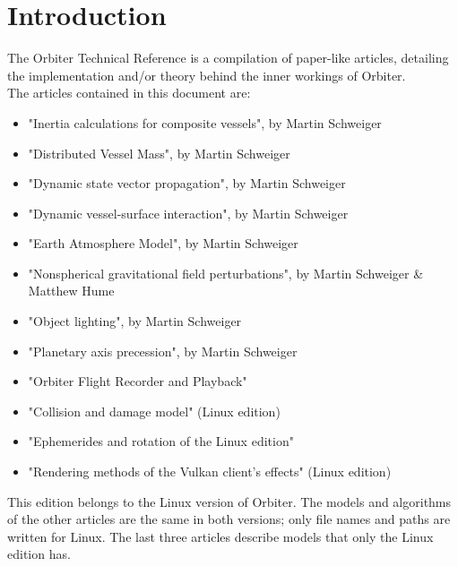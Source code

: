 \documentclass[Orbiter Technical Reference.tex]{subfiles}
\begin{document}
\section{Introduction}
The Orbiter Technical Reference is a compilation of paper-like articles, detailing the implementation and/or theory behind the inner workings of Orbiter.\\
The articles contained in this document are:

\begin{itemize}
\item "Inertia calculations for composite vessels", by Martin Schweiger
\item "Distributed Vessel Mass", by Martin Schweiger
\item "Dynamic state vector propagation", by Martin Schweiger
\item "Dynamic vessel-surface interaction", by Martin Schweiger
\item "Earth Atmosphere Model", by Martin Schweiger
\item "Nonspherical gravitational field perturbations", by Martin Schweiger \& Matthew Hume
\item "Object lighting", by Martin Schweiger
\item "Planetary axis precession", by Martin Schweiger
\item "Orbiter Flight Recorder and Playback"
\item "Collision and damage model" (Linux edition)
\item "Ephemerides and rotation of the Linux edition"
\item "Rendering methods of the Vulkan client's effects" (Linux edition)
\end{itemize}

\noindent
This edition belongs to the Linux version of Orbiter. The models and algorithms of the other articles are the same in both versions; only file names and paths are written for Linux. The last three articles describe models that only the Linux edition has.
\end{document}
